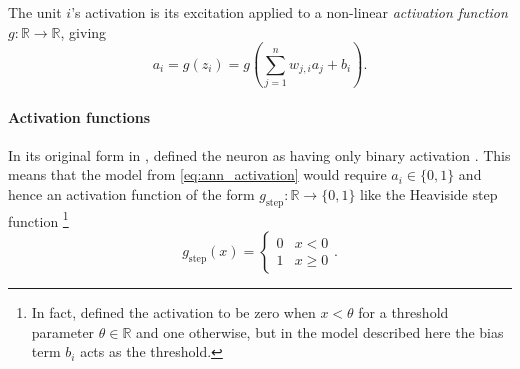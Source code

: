 \documentclass[../report.tex]{subfiles}
\begin{document}
The unit $i$'s activation is its excitation applied to a non-linear \emph{activation function} $g: \mathbb{R} \rightarrow \mathbb{R}$, giving
\begin{equation}
    \label{eq:ann_activation}
    a_i = g\left(z_i\right) = g\left(\sum_{j=1}^n{w_{j,i} a_j} + b_i\right).
\end{equation}

\paragraph{Activation functions}
In its original form in \citeyear{mcculloch1943}, \citeauthor{mcculloch1943} defined the neuron as having only binary activation \cite*{mcculloch1943}. 
This means that the model from \cref{eq:ann_activation} would require $a_i \in \{0, 1\}$ and hence an activation function of the form $g_\text{step}: \mathbb{R} \rightarrow \{0, 1\}$ like the Heaviside step function%
\footnote{In fact, \citeauthor{mcculloch1943} defined the activation to be zero when $x<\theta$ for a threshold parameter $\theta \in \mathbb{R}$ and one otherwise, but in the model described here the bias term $b_i$ acts as the threshold.}
\begin{equation*}
    \label{eq:step_activation}
    g_\text{step}(x) = \begin{cases} 
        0 & x < 0 \\
        1 & x \geq 0
    \end{cases}.
\end{equation*}
\end{document}
